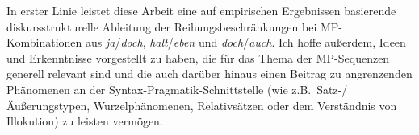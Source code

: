 \noindent
In erster Linie leistet diese Arbeit eine auf empirischen Ergebnissen basierende diskursstrukturelle Ableitung der Reihungsbeschränkungen bei MP-Kombinatio\-nen aus \textit{ja}/\textit{doch}, \textit{halt}/\textit{eben} und \textit{doch}/\textit{auch}. Ich hoffe außerdem, Ideen und Er\-kenntnisse vorgestellt zu haben, die für das Thema der MP-Sequenzen generell re\-levant sind und die auch darüber hinaus einen Beitrag zu angrenzenden Phänomenen an der Syntax-Pragmatik-Schnittstelle (wie z.B.\ Satz-/Äußerungstypen, Wur\-zelphänomenen, Relativsätzen oder dem Verständnis von Illokution) zu leisten vermögen.
















